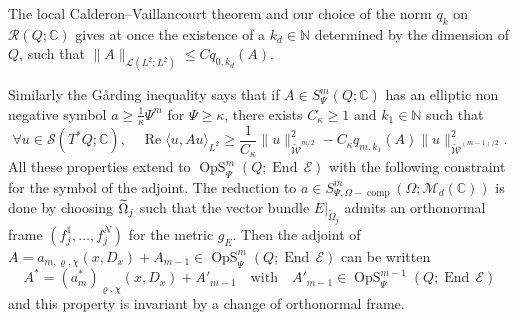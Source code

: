 \documentclass[10pt]{amsart}
\theoremstyle{definition}\newtheorem{defi}[theo]{Definition}\newtheorem{rema}[theo]{Remark}\newtheorem{exam}[theo]{Example}\newtheorem{exem}[theo]{Example}\newtheorem{nota}[theo]{Notation}
\newcommand{\C}{\mathbb{C}}
\newcommand{\N}{\mathbb{N}}
\newcommand{\clW}{\mathcal{W}}
\newcommand{\clE}{\mathcal{E}}
\newcommand{\clS}{\mathcal{S}}
\newcommand{\clL}{\mathcal{L}}
\newcommand{\clR}{\mathcal{R}}
\newcommand{\clM}{\mathcal{M}}
\DeclareMathOperator{\Ree}{Re}
\DeclareMathOperator{\End}{End}
\DeclareMathOperator{\OpS}{OpS}
\DeclareMathOperator{\ccomp}{comp}
\let\oldtilde\tilde
\renewcommand*{\tilde}[1]{\mathchoice{\widetilde{#1}}{\widetilde{#1}}{\oldtilde{#1}}{\oldtilde{#1}}}
\let\oldforall\forall
\renewcommand*{\forall}{\mathrel{\oldforall}}
\begin{document}
The local Calderon--Vaillancourt theorem and our choice of the norm $q_{k}$ on $\clR(Q;\C)$ gives at once the existence of a $k_{d}\in \N$ determined by the dimension of $Q$, such that $\|A\|_{\clL(L^{2};L^{2})}\leq C q_{0,k_{d}}(A)$.

Similarly the G\aa rding inequality says that if $A\in S^{m}_{\Psi}(Q;\C)$ has an elliptic non negative symbol $a\geq \frac{1}{\kappa}\Psi^{m}$ for $\Psi\geq \kappa$, there exists $C_{\kappa}\geq 1$ and $k_{1}\in \N$ such that
\[
\forall u\in \clS(T^{*}Q;\C),\quad \Ree\langle u, A u\rangle_{L^{2}}\geq \frac{1}{C_{\kappa}}\|u\|^{2}_{\widetilde{\clW}^{m/2}}-C_{\kappa}q_{m,k_{1}}(A)\|u\|_{\widetilde{\clW}^{(m-1)/2}}^{2}.
\]
All these properties extend to $\OpS^{m}_{\Psi}(Q;\End\,\clE)$ with the following constraint for the symbol of the adjoint. The reduction to $a\in S^{m}_{\Psi, \Omega-\ccomp}(\Omega;\clM_{d}(\C))$ is done by choosing $\tilde{\Omega}_{j}$ such that the vector bundle $E|_{\widetilde{\Omega}_{j}}$ admits an orthonormal frame $(f_{j}^{1},\dots,f_{j}^{N})$ for the metric $g_{E}$. Then the adjoint of $A=a_{m,\varrho,\chi}(x,D_{x})+A_{m-1}\in \OpS^{m}_{\Psi}(Q;\End\,\clE)$ can be written
\[
A^{*}=(a_{m}^{*})_{\varrho,\chi}(x,D_{x})+A'_{m-1}\quad\text{with}\quad A'_{m-1}\in \OpS^{m-1}_{\Psi}(Q;\End\,\clE)
\]
and this property is invariant by a change of orthonormal frame.
\end{document}
